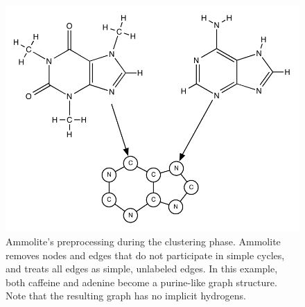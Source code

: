 \documentclass[review,preprint,12pt]{elsarticle}
\theoremstyle{definition}
\theoremstyle{remark}
\begin{document}
\begin{figure}[hbp]
    \centering
    \includegraphics[width=1\textwidth]{assets/ammolite-simplification.pdf}
    \caption{ Ammolite's preprocessing during the clustering phase. Ammolite 
    removes nodes and edges that do not participate in simple cycles, and 
    treats all edges as simple, unlabeled edges. In this example, both caffeine 
    and adenine become a purine-like graph structure. Note that the resulting 
    graph has no implicit hydrogens.
    }
    \label{fig:ammolite}
\end{figure}
\end{document}
